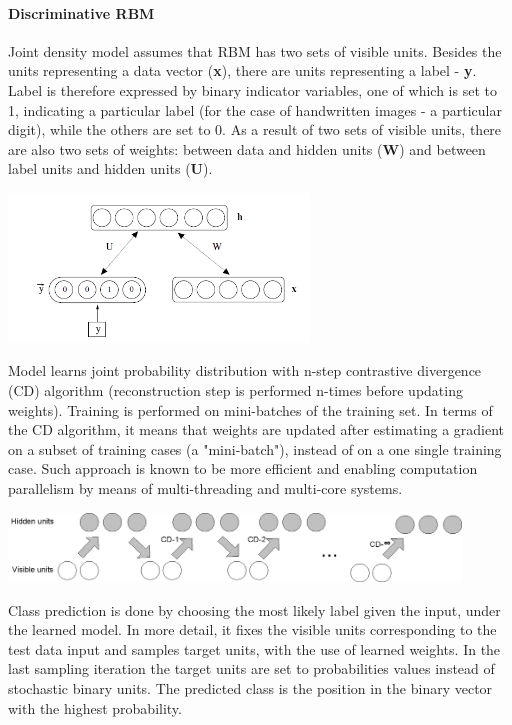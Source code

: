 \documentclass[a4paper]{scrartcl}
\begin{document}
\paragraph{Discriminative RBM}
Joint density model assumes that RBM has two sets of visible units. Besides the units representing a data vector ({\bfseries x}), there are units representing a label - {\bfseries y}. Label is therefore expressed by binary indicator variables, one of which is set to 1, indicating a particular label (for the case of handwritten images - a particular digit), while the others are set to 0. 
As a result of two sets of visible units, there are also two sets of weights: between data and hidden units ({\bfseries W}) and between label units and hidden units ({\bfseries U}). 
\begin{center}
\includegraphics[width=8cm]{images/jointProbModel2.png}
\end{center}
Model learns joint probability distribution with n-step contrastive divergence (CD) algorithm (reconstruction step is performed n-times before updating weights). Training is performed on mini-batches of the training set. In terms of the CD algorithm, it means that weights are updated after estimating a gradient on a subset of training cases (a "mini-batch"), instead of on a one single training case. Such approach is known to be more efficient and enabling computation parallelism by means of multi-threading and multi-core systems.
\begin{center}
\includegraphics[width=12cm]{images/cd-n.png}
\end{center} 
\par Class prediction is done by choosing the most likely label given the input, under the learned model. In more detail, it fixes the visible units corresponding to the test data input and samples target units, with the use of learned weights. In the last sampling iteration the target units are set to probabilities values instead of stochastic binary units. The predicted class is the position in the binary vector with the highest probability. 
\end{document}
